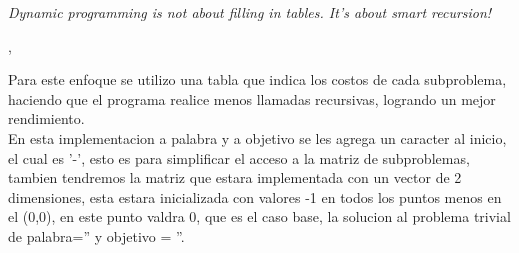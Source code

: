 \epigraph{\textit{Dynamic programming is not about filling in tables. It's about smart recursion!}}{\citeauthor{algorithms_erickson}, \citeyear{algorithms_erickson} \cite{algorithms_erickson}}


Para este enfoque se utilizo una tabla que indica los costos de cada subproblema, haciendo que el programa realice menos llamadas recursivas, logrando un mejor rendimiento.\\
En esta implementacion a palabra y a objetivo se les agrega un caracter al inicio, el cual es '-', esto es para simplificar el acceso a la matriz de subproblemas, tambien tendremos la matriz que estara implementada con un vector de 2 dimensiones, esta estara inicializada con valores -1 en todos los puntos menos en el (0,0), en este punto valdra 0, que es el caso base, la solucion al problema trivial de palabra='' y objetivo = ''.\\

